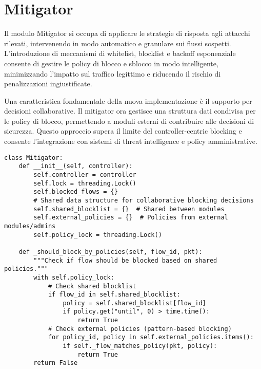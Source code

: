 \section{Mitigator}
Il modulo Mitigator si occupa di applicare le strategie di risposta agli attacchi rilevati, intervenendo in modo automatico e granulare sui flussi sospetti. L'introduzione di meccanismi di whitelist, blocklist e backoff esponenziale consente di gestire le policy di blocco e sblocco in modo intelligente, minimizzando l'impatto sul traffico legittimo e riducendo il rischio di penalizzazioni ingiustificate.\par
Una caratteristica fondamentale della nuova implementazione è il supporto per decisioni collaborative. Il mitigator ora gestisce una struttura dati condivisa per le policy di blocco, permettendo a moduli esterni di contribuire alle decisioni di sicurezza. Questo approccio supera il limite del controller-centric blocking e consente l'integrazione con sistemi di threat intelligence e policy amministrative.
\begin{verbatim}
class Mitigator:
    def __init__(self, controller):
        self.controller = controller
        self.lock = threading.Lock()
        self.blocked_flows = {}
        # Shared data structure for collaborative blocking decisions
        self.shared_blocklist = {}  # Shared between modules
        self.external_policies = {}  # Policies from external modules/admins
        self.policy_lock = threading.Lock()
        
    def _should_block_by_policies(self, flow_id, pkt):
        """Check if flow should be blocked based on shared policies."""
        with self.policy_lock:
            # Check shared blocklist
            if flow_id in self.shared_blocklist:
                policy = self.shared_blocklist[flow_id]
                if policy.get("until", 0) > time.time():
                    return True
            # Check external policies (pattern-based blocking)
            for policy_id, policy in self.external_policies.items():
                if self._flow_matches_policy(pkt, policy):
                    return True
        return False
\end{verbatim}

